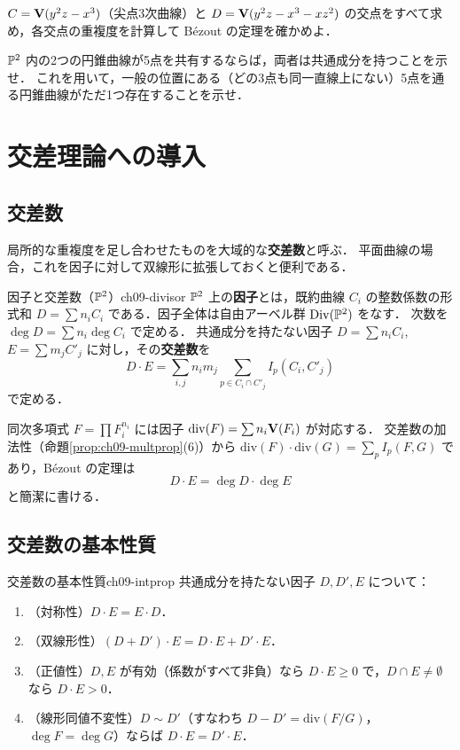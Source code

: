 $C=\mathbf{V}(y^2z-x^3)$（尖点3次曲線）と $D=\mathbf{V}(y^2z-x^3-xz^2)$ の交点をすべて求め，各交点の重複度を計算して B\'ezout の定理を確かめよ．

$\mathbb{P}^2$ 内の2つの円錐曲線が5点を共有するならば，両者は共通成分を持つことを示せ．
これを用いて，一般の位置にある（どの3点も同一直線上にない）5点を通る円錐曲線がただ1つ存在することを示せ．

\section{交差理論への導入}

\subsection{交差数}

局所的な重複度を足し合わせたものを大域的な\textbf{交差数}と呼ぶ．
平面曲線の場合，これを因子に対して双線形に拡張しておくと便利である．

\begin{mydef}{因子と交差数（$\mathbb{P}^2$）}{ch09-divisor}
$\mathbb{P}^2$ 上の\textbf{因子}とは，既約曲線 $C_i$ の整数係数の形式和 $D=\sum n_iC_i$ である．因子全体は自由アーベル群 $\operatorname{Div}(\mathbb{P}^2)$ をなす．
次数を $\deg D=\sum n_i\deg C_i$ で定める．
共通成分を持たない因子 $D=\sum n_iC_i$, $E=\sum m_jC'_j$ に対し，その\textbf{交差数}を
\[
  D\cdot E=\sum_{i,j}n_im_j\sum_{p\in C_i\cap C'_j}I_p(C_i,C'_j)
\]
で定める．
\end{mydef}

同次多項式 $F=\prod F_i^{n_i}$ には因子 $\mathrm{div}(F)=\sum n_i\mathbf{V}(F_i)$ が対応する．
交差数の加法性（命題\ref{prop:ch09-multprop}(6)）から $\mathrm{div}(F)\cdot\mathrm{div}(G)=\sum_pI_p(F,G)$ であり，B\'ezout の定理は
\[
  D\cdot E=\deg D\cdot\deg E
\]
と簡潔に書ける．

\subsection{交差数の基本性質}

\begin{myprop}{交差数の基本性質}{ch09-intprop}
共通成分を持たない因子 $D,D',E$ について：
\begin{enumerate}
  \item（対称性）$D\cdot E=E\cdot D$．
  \item（双線形性）$(D+D')\cdot E=D\cdot E+D'\cdot E$．
  \item（正値性）$D,E$ が有効（係数がすべて非負）なら $D\cdot E\ge0$ で，$D\cap E\neq\emptyset$ なら $D\cdot E>0$．
  \item（線形同値不変性）$D\sim D'$（すなわち $D-D'=\mathrm{div}(F/G)$，$\deg F=\deg G$）ならば $D\cdot E=D'\cdot E$．
\end{enumerate}
\end{myprop}

